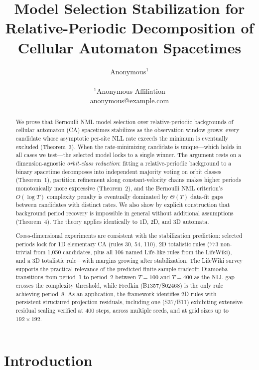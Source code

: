 \documentclass[letterpaper]{article}
\title{Model Selection Stabilization for Relative-Periodic Decomposition of Cellular Automaton Spacetimes}
\author{Anonymous$^{1}$ \\
\mbox{}\\
$^1$Anonymous Affiliation \\
anonymous@example.com}
\theoremstyle{definition}
\theoremstyle{remark}
\begin{document}
\maketitle

\begin{abstract}
We prove that Bernoulli NML model selection over relative-periodic backgrounds of cellular automaton (CA) spacetimes stabilizes as the observation window grows: every candidate whose asymptotic per-site NLL rate exceeds the minimum is eventually excluded (Theorem~3). When the rate-minimizing candidate is unique---which holds in all cases we test---the selected model locks to a single winner.
The argument rests on a dimension-agnostic \emph{orbit-class reduction}: fitting a relative-periodic background to a binary spacetime decomposes into independent majority voting on orbit classes (Theorem~1), partition refinement along constant-velocity chains makes higher periods monotonically more expressive (Theorem~2), and the Bernoulli NML criterion's $O(\log T)$ complexity penalty is eventually dominated by $\Theta(T)$ data-fit gaps between candidates with distinct rates.
We also show by explicit construction that background period recovery is impossible in general without additional assumptions (Theorem~4).
The theory applies identically to 1D, 2D, and 3D automata.

Cross-dimensional experiments are consistent with the stabilization prediction: selected periods lock for 1D elementary CA (rules 30, 54, 110), 2D totalistic rules (773 non-trivial from 1{,}050 candidates, plus all 106 named Life-like rules from the LifeWiki), and a 3D totalistic rule---with margins growing after stabilization.
The LifeWiki survey supports the practical relevance of the predicted finite-sample tradeoff: Diamoeba transitions from period~1 to period~2 between $T{=}100$ and $T{=}400$ as the NLL gap crosses the complexity threshold, while Fredkin (B1357/S02468) is the only rule achieving period~8.
As an application, the framework identifies 2D rules with persistent structured projection residuals, including one (S37/B11) exhibiting extensive residual scaling verified at 400 steps, across multiple seeds, and at grid sizes up to $192 \times 192$.
\end{abstract}

\section{Introduction}
\end{document}
